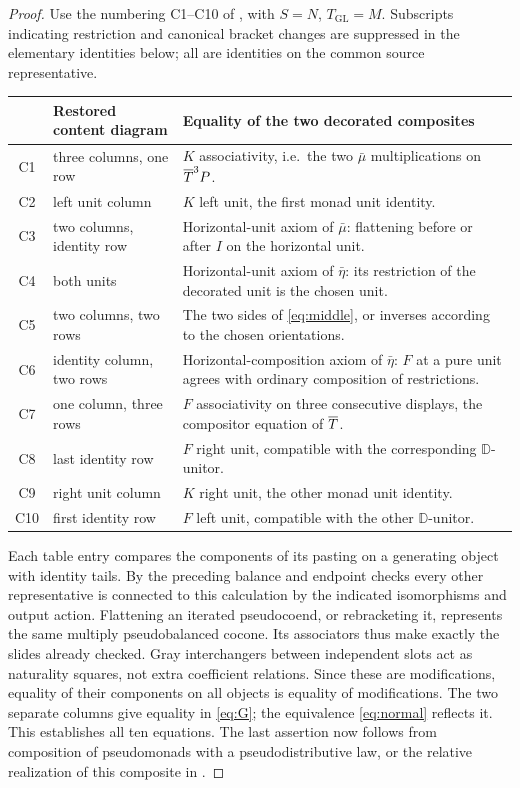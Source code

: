 \documentclass[11pt]{article}
\theoremstyle{definition}\newtheorem{definition}[theorem]{Definition}
\newcommand{\D}{\mathbb D}\newcommand{\N}{\mathbb N}
\begin{document}
\begin{proof}
Use the numbering C1--C10 of \cite[Def.~4.1 and App.~A]{GL},
with $S=N$, $T_{\mathrm{GL}}=M$. Subscripts indicating restriction
and canonical bracket changes are suppressed in the elementary
identities below; all are identities on the common source representative.
\begin{center}\small
\begin{tabular}{@{}clp{.53\linewidth}@{}}
\toprule
 &Restored content diagram&Equality of the two decorated composites\\
\midrule
C1&three columns, one row&$K$ associativity, i.e.\ the two $\bar\mu$ multiplications on $\overline T^3P$.\\
C2&left unit column&$K$ left unit, the first monad unit identity.\\
C3&two columns, identity row&Horizontal-unit axiom of $\bar\mu$: flattening before or after $I$ on the horizontal unit.\\
C4&both units&Horizontal-unit axiom of $\bar\eta$: its restriction of the decorated unit is the chosen unit.\\
C5&two columns, two rows&The two sides of \eqref{eq:middle}, or inverses according to the chosen orientations.\\
C6&identity column, two rows&Horizontal-composition axiom of $\bar\eta$: $F$ at a pure unit agrees with ordinary composition of restrictions.\\
C7&one column, three rows&$F$ associativity on three consecutive displays, the compositor equation of $\overline T$.\\
C8&last identity row&$F$ right unit, compatible with the corresponding $\D$-unitor.\\
C9&right unit column&$K$ right unit, the other monad unit identity.\\
C10&first identity row&$F$ left unit, compatible with the other $\D$-unitor.\\
\bottomrule
\end{tabular}
\end{center}
Each table entry compares the components of its pasting on a
generating object with identity tails. By the preceding balance and
endpoint checks every other representative is connected to this
calculation by the indicated isomorphisms and output action.
Flattening an iterated pseudocoend, or rebracketing it, represents the
same multiply pseudobalanced cocone. Its associators thus make
exactly the slides already checked. Gray interchangers between
independent slots act as naturality squares, not extra coefficient
relations. Since these are modifications, equality of their
components on all objects is equality of modifications. The two
separate columns give equality in \eqref{eq:G}; the equivalence
\eqref{eq:normal} reflects it. This establishes all ten equations.
The last assertion now follows from composition of pseudomonads
with a pseudodistributive law, or the relative realization of this
composite in \cite[Sec.~6]{U}.
\end{proof}
\end{document}
